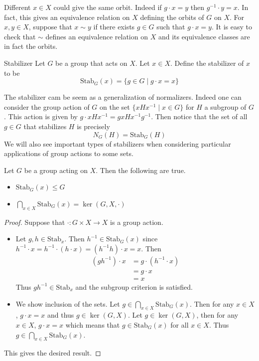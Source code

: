 \documentclass[a4paper]{article}
\begin{document}
Different $x\in X$ could give the same orbit. Indeed if $g\cdot x=y$ then $g^{-1}\cdot y=x$. In fact, this gives an equivalence relation on $X$ defining the orbits of $G$ on $X$. For $x,y\in X$, suppose that $x\sim y$ if there exists $g\in G$ such that $g\cdot x=y$. It is easy to check that $\sim$ defines an equivalence relation on $X$ and its equivalence classes are in fact the orbits. 

\begin{defn}{Stabilizer}{} Let $G$ be a group that acts on $X$. Let $x\in X$. Define the stabilizer of $x$ to be $$\text{Stab}_G(x)=\{g\in G\;|\;g\cdot x=x\}$$
\end{defn}

The stabilizer cam be seem as a generalization of normalizers. Indeed one can consider the group action of $G$ on the set $\{xHx^{-1}\;|\;x\in G\}$ for $H$ a subgroup of $G$. This action is given by $g\cdot xHx^{-1}=gxHx^{-1}g^{-1}$. Then notice that the set of all $g\in G$ that stabilizes $H$ is precisely $$N_G(H)=\text{Stab}_G(H)$$ We will also see important types of stabilizers when considering particular applications of group actions to some sets. 

\begin{prp}{}{} Let $G$ be a group acting on $X$. Then the following are true. 
\begin{itemize}
\item $\text{Stab}_G(x)\leq G$ 
\item $\bigcap_{x\in X}\text{Stab}_G(x)=\ker(G,X,\cdot)$
\end{itemize}
\begin{proof} Suppose that $\cdot:G\times X\to X$ is a group action. 
\begin{itemize}
\item Let $g,h\in\text{Stab}_x$. Then $h^{-1}\in\text{Stab}_G(x)$ since $h^{-1}\cdot x=h^{-1}\cdot(h\cdot x)=(h^{-1}h)\cdot x=x$. Then
\begin{align*}
(gh^{-1})\cdot x&=g\cdot(h^{-1}\cdot x)\\
&=g\cdot x\\
&=x
\end{align*}
Thus $gh^{-1}\in\text{Stab}_x$ and the subgroup criterion is satisfied. 
\item We show inclusion of the sets. Let $g\in\bigcap_{x\in X}\text{Stab}_G(x)$. Then for any $x\in X$, $g\cdot x=x$ and thus $g\in\ker(G,X)$. Let $g\in\ker(G,X)$, then for any $x\in X$, $g\cdot x=x$ which means that $g\in\text{Stab}_G(x)$ for all $x\in X$. Thus $g\in\bigcap_{x\in X}\text{Stab}_G(x)$. 
\end{itemize}
This gives the desired result. 
\end{proof}
\end{prp}
\end{document}
